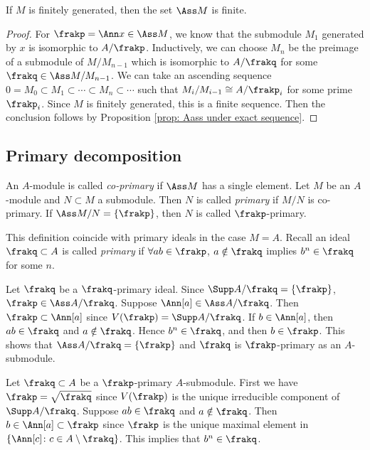     \begin{corollary}\label{cor: Ass is finite}
        If $M$ is finitely generated, then the set $\Ass M$ is finite.
    \end{corollary}
    \begin{proof}
        For $\frakp = \Ann x \in \Ass M$, we know that the submodule $M_1$ generated by $x$ is isomorphic to $A/\frakp$.
        Inductively, we can choose $M_n$ be the preimage of a submodule of $M/M_{n-1}$ which is isomorphic to $A/\frakq$ for some $\frakq \in \Ass M/M_{n-1}$.
        We can take an ascending sequence $0 = M_0 \subset M_1 \subset \cdots \subset M_n \subset \cdots$ such that $M_i/M_{i-1} \cong A/\frakp_i$ for some prime $\frakp_i$.
        Since $M$ is finitely generated, this is a finite sequence.
        Then the conclusion follows by Proposition \ref{prop: Aass under exact sequence}.
    \end{proof}

\subsection{Primary decomposition}

    \begin{definition}\label{def: co-primary and primary}
        An $A$-module is called \textit{co-primary} if $\Ass M$ has a single element.
        Let $M$ be an $A$-module and $N \subset M$ a submodule.
        Then $N$ is called \textit{primary} if $M/N$ is co-primary.
        If $\Ass M/N = \{\frakp\}$, then $N$ is called $\frakp$-primary.
    \end{definition}

    \begin{remark}\label{rem: primary submodule and primary ideal}
        This definition coincide with primary ideals in the case $M = A$.
        Recall an ideal $\frakq \subset A$ is called \textit{primary} if $\forall ab \in \frakp$, 
        $a \notin \frakq$ implies $b^n \in \frakq$ for some $n$. 
        
        Let $\frakq$ be a $\frakq$-primary ideal.
        Since $\Supp A/\frakq = \{\frakp\}$, $\frakp \in \Ass A/\frakq$.
        Suppose $\Ann [a] \in \Ass A/\frakq$.
        Then $\frakp \subset \Ann [a]$ since $V(\frakp) = \Supp A/\frakq$.
        If $b \in \Ann [a]$, then $ab \in \frakq$ and $a\notin \frakq$.
        Hence $b^n \in \frakq$, and then $b \in \frakp$.
        This shows that $\Ass A/\frakq = \{\frakp\}$ and $\frakq$ is $\frakp$-primary as an $A$-submodule. 

        Let $\frakq \subset A$ be a $\frakp$-primary $A$-submodule.
        First we have $\frakp = \sqrt{\frakq}$ since $V(\frakp)$ is the unique irreducible component of $\Supp A/\frakq$.
        Suppose $ab \in \frakq$ and $a\notin \frakq$.
        Then $b \in \Ann [a] \subset \frakp$ since $\frakp$ is the unique maximal element in $\{ \Ann [c] \colon c \in A \setminus \frakq\}$.
        This implies that $b^n \in \frakq$.
    \end{remark}

